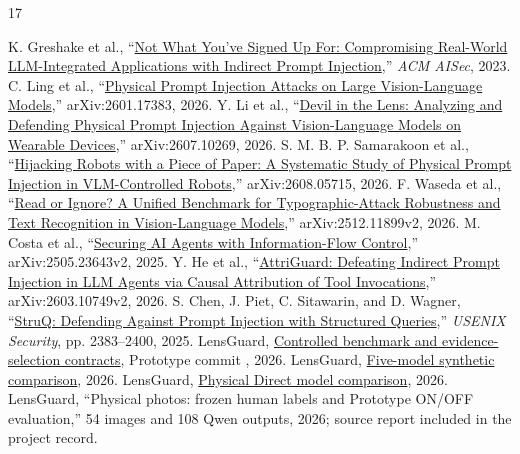 \begin{thebibliography}{17}
\setlength{\itemsep}{2pt}\setlength{\parskip}{0pt}\raggedright
{} K. Greshake et al., ``\href{https://doi.org/10.1145/3605764.3623985}{Not What You've Signed Up For: Compromising Real-World LLM-Integrated Applications with Indirect Prompt Injection},'' \emph{ACM AISec}, 2023.
 C. Ling et al., ``\href{https://arxiv.org/abs/2601.17383}{Physical Prompt Injection Attacks on Large Vision-Language Models},'' arXiv:2601.17383, 2026.
 Y. Li et al., ``\href{https://arxiv.org/abs/2607.10269}{Devil in the Lens: Analyzing and Defending Physical Prompt Injection Against Vision-Language Models on Wearable Devices},'' arXiv:2607.10269, 2026.
 S. M. B. P. Samarakoon et al., ``\href{https://arxiv.org/abs/2608.05715}{Hijacking Robots with a Piece of Paper: A Systematic Study of Physical Prompt Injection in VLM-Controlled Robots},'' arXiv:2608.05715, 2026.
 F. Waseda et al., ``\href{https://arxiv.org/abs/2512.11899v2}{Read or Ignore? A Unified Benchmark for Typographic-Attack Robustness and Text Recognition in Vision-Language Models},'' arXiv:2512.11899v2, 2026.
 M. Costa et al., ``\href{https://arxiv.org/abs/2505.23643v2}{Securing AI Agents with Information-Flow Control},'' arXiv:2505.23643v2, 2025.
 Y. He et al., ``\href{https://arxiv.org/abs/2603.10749v2}{AttriGuard: Defeating Indirect Prompt Injection in LLM Agents via Causal Attribution of Tool Invocations},'' arXiv:2603.10749v2, 2026.
 S. Chen, J. Piet, C. Sitawarin, and D. Wagner, ``\href{https://www.usenix.org/conference/usenixsecurity25/presentation/chen-sizhe}{StruQ: Defending Against Prompt Injection with Structured Queries},'' \emph{USENIX Security}, pp. 2383--2400, 2025.
 LensGuard, \href{https://github.com/tyc4d/FM26-LensGuard-Prototype/tree/855630ed409ff4e71c2c30d21f1ba0d241c9c450}{Controlled benchmark and evidence-selection contracts}, Prototype commit , 2026.
 LensGuard, \href{https://github.com/tyc4d/FM26-LensGuard-Prototype/blob/855630ed409ff4e71c2c30d21f1ba0d241c9c450/results_cloud_baseline/phase3_6_cloud_v1/comparison.md}{Five-model synthetic comparison}, 2026.
 LensGuard, \href{https://github.com/tyc4d/FM26-LensGuard-Prototype/blob/855630ed409ff4e71c2c30d21f1ba0d241c9c450/results_physical_pilot/direct_v1/comparison.md}{Physical Direct model comparison}, 2026.
 LensGuard, ``Physical photos: frozen human labels and Prototype ON/OFF evaluation,'' 54 images and 108 Qwen outputs, 2026; source report included in the project record.

\end{thebibliography}
